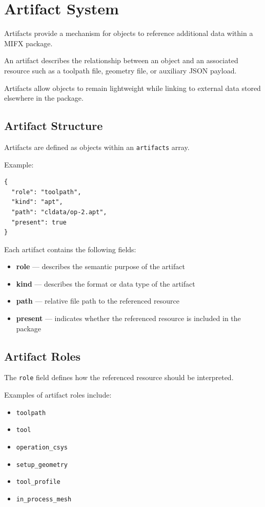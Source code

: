 \section{Artifact System}

Artifacts provide a mechanism for objects to reference additional data within a MIFX package.

An artifact describes the relationship between an object and an associated resource such as a toolpath file, geometry file, or auxiliary JSON payload.

Artifacts allow objects to remain lightweight while linking to external data stored elsewhere in the package.

\subsection{Artifact Structure}

Artifacts are defined as objects within an \texttt{artifacts} array.

Example:

\begin{verbatim}
{
  "role": "toolpath",
  "kind": "apt",
  "path": "cldata/op-2.apt",
  "present": true
}
\end{verbatim}

Each artifact contains the following fields:

\begin{itemize}
\item \textbf{role} — describes the semantic purpose of the artifact
\item \textbf{kind} — describes the format or data type of the artifact
\item \textbf{path} — relative file path to the referenced resource
\item \textbf{present} — indicates whether the referenced resource is included in the package
\end{itemize}

\subsection{Artifact Roles}

The \texttt{role} field defines how the referenced resource should be interpreted.

Examples of artifact roles include:

\begin{itemize}
\item \texttt{toolpath}
\item \texttt{tool}
\item \texttt{operation\_csys}
\item \texttt{setup\_geometry}
\item \texttt{tool\_profile}
\item \texttt{in\_process\_mesh}
\end{itemize}

